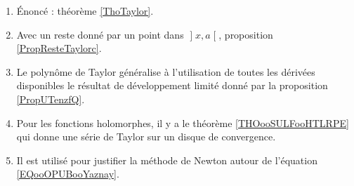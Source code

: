 
    \begin{enumerate}
    \item
        Énoncé : théorème \ref{ThoTaylor}.

    \item
    Avec un reste donné par un point dans \( \mathopen] x , a \mathclose[\), proposition \ref{PropResteTaylorc}.

        \item
            Le polynôme de Taylor généralise à l'utilisation de toutes les dérivées disponibles le résultat de développement limité donné par la proposition \ref{PropUTenzfQ}.
        \item
            Pour les fonctions holomorphes, il y a le théorème \ref{THOooSULFooHTLRPE} qui donne une série de Taylor sur un disque de convergence.
        \item
            Il est utilisé pour justifier la méthode de Newton autour de l'équation \eqref{EQooOPUBooYaznay}.
        \end{enumerate}

